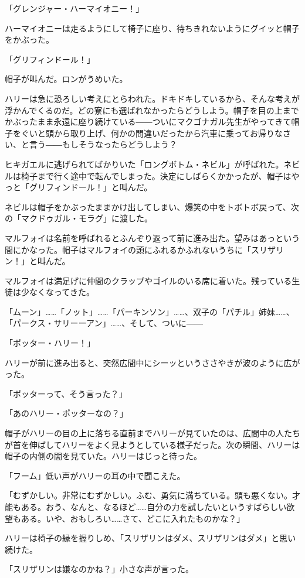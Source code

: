 \documentclass[10pt,a4paper]{article}
\begin{document}
\begin{CJK}{UTF8}{min}
「グレンジャー・ハーマイオニー！」

ハーマイオニーは走るようにして椅子に座り、待ちきれないようにグイッと帽子をかぶった。

「グリフィンドール！」

帽子が叫んだ。ロンがうめいた。

ハリーは急に恐ろしい考えにとらわれた。ドキドキしているから、そんな考えが浮かんでくるのだ。どの寮にも選ばれなかったらどうしよう。帽子を目の上までかぶったまま永遠に座り続けている――ついにマクゴナガル先生がやってきて帽子をぐいと頭から取り上げ、何かの問違いだったから汽車に乗ってお帰りなさい、と言う――もしそうなったらどうしよう？

ヒキガエルに逃げられてばかりいた「ロングボトム・ネビル」が呼ばれた。ネビルは椅子まで行く途中で転んでしまった。決定にしばらくかかったが、帽子はやっと「グリフィンドール！」と叫んだ。

ネビルは帽子をかぶったままかけ出してしまい、爆笑の中をトボトボ戻って、次の「マクドゥガル・モラグ」に渡した。

マルフォイは名前を呼ばれるとふんぞり返って前に進み出た。望みはあっという間にかなった。帽子はマルフォイの頭にふれるかふれないうちに「スリザリン！」と叫んだ。

マルフォイは満足げに仲間のクラップやゴイルのいる席に着いた。残っている生徒は少なくなってきた。

「ムーン」……「ノット」……「パーキンソン」……、双子の「パチル」姉妹……、「パークス・サリーーアン」……、そして、ついに――

「ポッター・ハリー！」

ハリーが前に進み出ると、突然広間中にシーッというささやきが波のように広がった。

「ポッターって、そう言った？」

「あのハリー・ポッターなの？」

帽子がハリーの目の上に落ちる直前までハリーが見ていたのは、広間中の人たちが首を伸ばしてハリーをよく見ようとしている様子だった。次の瞬間、ハリーは帽子の内側の闇を見ていた。ハリーはじっと待った。

「フーム」低い声がハリーの耳の中で聞こえた。

「むずかしい。非常にむずかしい。ふむ、勇気に満ちている。頭も悪くない。才能もある。おう、なんと、なるほど……自分の力を試したいというすばらしい欲望もある。いや、おもしろい……さて、どこに入れたものかな？」

ハリーは椅子の縁を握りしめ、「スリザリンはダメ、スリザリンはダメ」と思い続けた。

「スリザリンは嫌なのかね？」小さな声が言った。


\end{CJK}
\end{document}
